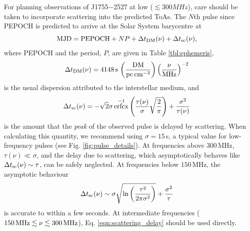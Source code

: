 \documentclass[preprint2,linenumbers]{aastex631}
\newcommand{\src}{J1755$-$2527}
\DeclareMathOperator{\erfcx}{erfcx}
\begin{document}
For planning observations of \src{} at low ($\lesssim 300 MHz$), care should be taken to incorporate scattering into the predicted ToAs.
The $N$th pulse since PEPOCH is predicted to arrive at the Solar System barycentre at
\begin{equation}
    {\rm MJD} = {\rm PEPOCH} + NP + \Delta t_{\rm DM}(\nu) + \Delta t_{\rm sc}(\nu),
\end{equation}
where PEPOCH and the period, $P$, are given in Table \ref{tbl:ephemeris},
\begin{equation}
    \Delta t_{\rm DM}(\nu) = 4148\,{\rm s} \, \left(\frac{\rm DM}{{\rm pc\,cm}^{-3}}\right) \left(\frac{\nu}{\rm MHz}\right)^{-2}
\end{equation}
is the usual dispersion attributed to the interstellar medium, and
\begin{equation}
    \Delta t_{\rm sc}(\nu) = -\sqrt{2}\sigma\erfcx^{-1}\left(\frac{\tau(\nu)}{\sigma}\sqrt{\frac{2}{\pi}}\right) + \frac{\sigma^2}{\tau(\nu)}
    \label{eqn:scattering_delay}
\end{equation}
is the amount that the \emph{peak} of the observed pulse is delayed by scattering.
When calculating this quantity, we recommend using $\sigma = 15\,$s, a typical value for low-frequency pulses (see Fig. \ref{fig:pulse_details}).
At frequencies above $300\,$MHz, $\tau(\nu) \ll \sigma$, and the delay due to scattering, which asymptotically behaves like $\Delta t_{\rm sc}(\nu) \sim \tau$, can be safely neglected.
At frequencies below $150\,$MHz, the asymptotic behaviour
\begin{equation}
    \Delta t_{\rm sc}(\nu) \sim \sigma \sqrt{\ln \left(\frac{\tau^2}{2\pi \sigma^2}\right)} + \frac{\sigma^2}{\tau}
\end{equation}
is accurate to within a few seconds.
At intermediate frequencies ($150\,{\rm MHz} \lesssim \nu \lesssim 300\,{\rm MHz}$), Eq. \eqref{eqn:scattering_delay} should be used directly.

\end{document}
